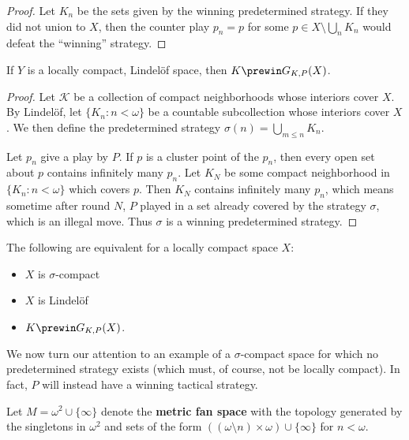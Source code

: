 \begin{proof}
Let $K_n$ be the sets given by the winning predetermined strategy. If they did not union to $X$, then the counter play $p_n=p$ for some $p\in X\setminus \bigcup_n K_n$ would defeat the ``winning'' strategy.
\end{proof}

\begin{thm}
If $Y$ is a locally compact, Lindel\"of space, then $K \prewin G_{K,P}(X)$.
\end{thm}

\begin{proof}
Let $\mathcal{K}$ be a collection of compact neighborhoods whose interiors cover $X$. By Lindel\"of, let $\{K_n : n<\omega\}$ be a countable subcollection whose interiors cover $X$. We then define the predetermined strategy $\sigma(n)=\bigcup_{m\leq n} K_n$.

Let $p_n$ give a play by $P$. If $p$ is a cluster point of the $p_n$, then every open set about $p$ contains infinitely many $p_n$. Let $K_N$ be some compact neighborhood in $\{K_n : n<\omega\}$ which covers $p$. Then $K_N$ contains infinitely many $p_n$, which means sometime after round $N$, $P$ played in a set already covered by the strategy $\sigma$, which is an illegal move. Thus $\sigma$ is a winning predetermined strategy.
\end{proof}

\begin{cor}
The following are equivalent for a locally compact space $X$:
    \begin{itemize}
    \item $X$ is $\sigma$-compact
    \item $X$ is Lindel\"of
    \item $K \prewin G_{K,P}(X)$.
    \end{itemize}
\end{cor}

We now turn our attention to an example of a $\sigma$-compact space for which no predetermined strategy exists (which must, of course, not be locally compact). In fact, $P$ will instead have a winning tactical strategy.

\begin{defn}
Let $M=\omega^2\cup\{\infty\}$ denote the \textbf{metric fan space} with the topology generated by the singletons in $\omega^2$ and sets of the form $((\omega\setminus n)\times\omega) \cup \{\infty\}$ for $n<\omega$.
\end{defn}

